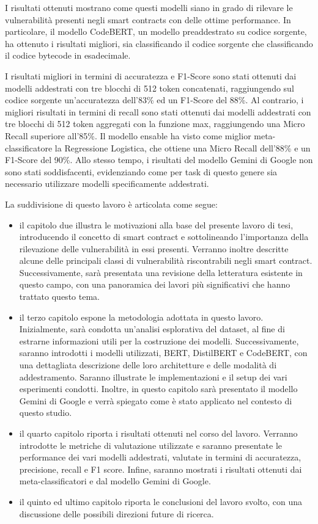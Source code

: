 \documentclass[../../Thesis.tex]{subfiles}
\begin{document}
I risultati ottenuti mostrano come questi modelli siano in grado di rilevare le vulnerabilità presenti negli smart contracts con delle ottime performance. In particolare, il modello CodeBERT, un modello preaddestrato su codice sorgente, ha ottenuto i risultati migliori, sia classificando il codice sorgente che classificando il codice bytecode in esadecimale. 

I risultati migliori in termini di accuratezza e F1-Score sono stati ottenuti dai modelli addestrati con tre blocchi di 512 token concatenati, raggiungendo sul codice sorgente un'accuratezza dell'83\% ed un F1-Score del 88\%. Al contrario, i migliori risultati in termini di recall sono stati ottenuti dai modelli addestrati con tre blocchi di 512 token aggregati con la funzione max, raggiungendo una Micro Recall superiore all'85\%. Il modello ensable ha visto come miglior meta-classificatore la Regressione Logistica, che ottiene una Micro Recall dell'88\% e un F1-Score del 90\%. Allo stesso tempo, i risultati del modello Gemini di Google non sono stati soddisfacenti, evidenziando come per task di questo genere sia necessario utilizzare modelli specificamente addestrati.

La suddivisione di questo lavoro è articolata come segue:
\begin{itemize}
    \item il capitolo due illustra le motivazioni alla base del presente lavoro di tesi, introducendo il concetto di smart contract e sottolineando l'importanza della rilevazione delle vulnerabilità in essi presenti. Verranno inoltre descritte alcune delle principali classi di vulnerabilità riscontrabili negli smart contract. Successivamente, sarà presentata una revisione della letteratura esistente in questo campo, con una panoramica dei lavori più significativi che hanno trattato questo tema.
    \item il terzo capitolo espone la metodologia adottata in questo lavoro. Inizialmente, sarà condotta un'analisi esplorativa del dataset, al fine di estrarne informazioni utili per la costruzione dei modelli.  
    Successivamente, saranno introdotti i modelli utilizzati, BERT, DistilBERT e CodeBERT, con una dettagliata descrizione delle loro architetture e delle modalità di addestramento. Saranno illustrate le implementazioni e il setup dei vari esperimenti condotti. Inoltre, in questo capitolo sarà presentato il modello Gemini di Google e verrà spiegato come è stato applicato nel contesto di questo studio.
    \item il quarto capitolo riporta i risultati ottenuti nel corso del lavoro. Verranno introdotte le metriche di valutazione utilizzate e saranno presentate le performance dei vari modelli addestrati, valutate in termini di accuratezza, precisione, recall e F1 score. Infine, saranno mostrati i risultati ottenuti dai meta-classificatori e dal modello Gemini di Google.
    \item il quinto ed ultimo capitolo riporta le conclusioni del lavoro svolto, con una discussione  delle possibili direzioni future di ricerca.     
\end{itemize}
\end{document}
